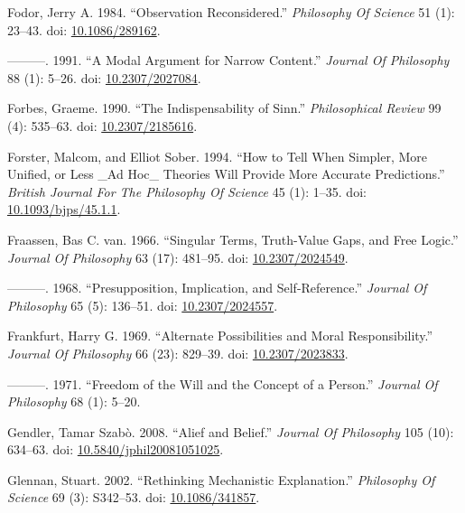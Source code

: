 \documentclass[
  10pt,
  letterpaper,
  DIV=11,
  numbers=noendperiod,
  twoside]{scrartcl}
\newlength{\cslhangindent}
\newenvironment{CSLReferences}[2] %
 {\begin{list}{}{%
  \setlength{\itemindent}{0pt}
  \setlength{\leftmargin}{0pt}
  \setlength{\parsep}{0pt}
  \ifodd #1
   \setlength{\leftmargin}{\cslhangindent}
   \setlength{\itemindent}{-1\cslhangindent}
  \fi
  \setlength{\itemsep}{#2\baselineskip}}}
 {\end{list}}
\begin{document}
\begin{CSLReferences}{1}{0}
Fodor, Jerry A. 1984. {``Observation Reconsidered.''} \emph{Philosophy
Of Science} 51 (1): 23--43. doi:
\href{https://doi.org/10.1086/289162}{10.1086/289162}.

---------. 1991. {``A Modal Argument for Narrow Content.''}
\emph{Journal Of Philosophy} 88 (1): 5--26. doi:
\href{https://doi.org/10.2307/2027084}{10.2307/2027084}.

Forbes, Graeme. 1990. {``The Indispensability of Sinn.''}
\emph{Philosophical Review} 99 (4): 535--63. doi:
\href{https://doi.org/10.2307/2185616}{10.2307/2185616}.

Forster, Malcom, and Elliot Sober. 1994. {``How to Tell When Simpler,
More Unified, or Less \_Ad Hoc\_ Theories Will Provide More Accurate
Predictions.''} \emph{British Journal For The Philosophy Of Science} 45
(1): 1--35. doi:
\href{https://doi.org/10.1093/bjps/45.1.1}{10.1093/bjps/45.1.1}.

Fraassen, Bas C. van. 1966. {``Singular Terms, Truth-Value Gaps, and
Free Logic.''} \emph{Journal Of Philosophy} 63 (17): 481--95. doi:
\href{https://doi.org/10.2307/2024549}{10.2307/2024549}.

---------. 1968. {``Presupposition, Implication, and Self-Reference.''}
\emph{Journal Of Philosophy} 65 (5): 136--51. doi:
\href{https://doi.org/10.2307/2024557}{10.2307/2024557}.

Frankfurt, Harry G. 1969. {``Alternate Possibilities and Moral
Responsibility.''} \emph{Journal Of Philosophy} 66 (23): 829--39. doi:
\href{https://doi.org/10.2307/2023833}{10.2307/2023833}.

---------. 1971. {``Freedom of the Will and the Concept of a Person.''}
\emph{Journal Of Philosophy} 68 (1): 5--20.

Gendler, Tamar Szabò. 2008. {``Alief and Belief.''} \emph{Journal Of
Philosophy} 105 (10): 634--63. doi:
\href{https://doi.org/10.5840/jphil20081051025}{10.5840/jphil20081051025}.

Glennan, Stuart. 2002. {``Rethinking Mechanistic Explanation.''}
\emph{Philosophy Of Science} 69 (3): S342--53. doi:
\href{https://doi.org/10.1086/341857}{10.1086/341857}.


\end{CSLReferences}
\end{document}
